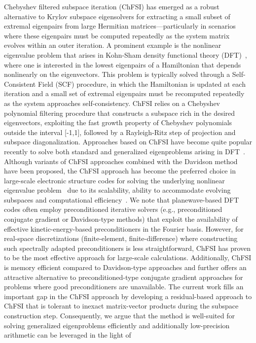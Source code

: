 \documentclass[preprint,3p,number,sort&compress]{elsarticle}
\newcommand{\cblue }{\color{black}}
\newcommand{\cn}{\color{black}}
\begin{document}
Chebyshev filtered subspace iteration (ChFSI) has emerged as a robust alternative to Krylov subspace eigensolvers for extracting a small subset of extremal eigenpairs from large Hermitian matrices—particularly in scenarios where these eigenpairs must be computed repeatedly as the system matrix evolves within an outer iteration. A prominent example is the nonlinear eigenvalue problem that arises in Kohn-Sham density functional theory (DFT)~\cite{kohnSelfconsistentEquationsIncluding1965}, where one is interested in the lowest eigenpairs of a Hamiltonian that depends nonlinearly on the eigenvectors. This problem is typically solved through a Self-Consistent Field (SCF) procedure, in which the Hamiltonian is updated at each iteration and a small set of extremal eigenpairs must be recomputed repeatedly as the system approaches self-consistency. ChFSI relies on a Chebyshev polynomial filtering procedure that constructs a subspace rich in the desired eigenvectors, exploiting the fast growth property of Chebyshev polynomials outside the interval [-1,1], followed by a Rayleigh-Ritz step of projection and subspace diagonalization. Approaches based on ChFSI have become quite popular recently to solve both standard and generalized eigenproblems arising in DFT~\cite{lohChebyshevFilteringLanczos1984,zhouParallelSelfconsistentfieldCalculations2006,motamarriHigherorderAdaptiveFiniteelement2013,levittParallelEigensolversPlanewave2015,wuAdvancingDistributedMultiGPU2023}. Although variants of ChFSI approaches combined with the Davidson method~\cite{zhouChebyshevDavidsonAlgorithm2007,miaoChebyshevDavidsonMethod2020,miaoFlexibleBlockChebyshevDavidson2023,wangNewSubspaceIteration2025} have been proposed, the ChFSI approach has become the preferred choice in large-scale electronic structure codes for solving the underlying nonlinear eigenvalue problem~\cite{dasDFTFE10Massively2022,ghoshSPARCAccurateEfficient2017a,zhouChebyshevfilteredSubspaceIteration2014,fengMassivelyParallelImplementation2024,banerjeeChebyshevPolynomialFiltered2016} due to its scalability, ability to accommodate evolving subspaces and computational efficiency~\cite{dasFastScalableAccurate2019,dasLargeScaleMaterialsModeling2023}. {\cblue We note that planewave-based DFT codes often employ preconditioned iterative solvers (e.g., preconditioned conjugate gradient or Davidson-type methods) that exploit the availability of effective kinetic-energy-based preconditioners in the Fourier basis. However, for real-space discretizations (finite-element, finite-difference) where constructing such spectrally adapted preconditioners is less straightforward, ChFSI has proven to be the most effective approach for large-scale calculations. Additionally, ChFSI is memory efficient compared to Davidson-type approaches and further offers an attractive alternative to preconditioned-type conjugate gradient approaches for problems where good preconditioners are unavailable.\cn} The current work fills an important gap in the ChFSI approach by developing a residual-based approach to ChFSI that is tolerant to inexact matrix-vector products during the subspace construction step. Consequently, we argue that the method is well-suited for solving generalized eigenproblems efficiently and additionally low-precision arithmetic can be leveraged in the light of 
\end{document}
